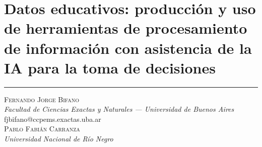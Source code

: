 \thispagestyle{portadapage}
\setcounter{subsection}{0}
\setcounter{subsubsection}{0}
\setcounter{actividad}{0}
\setcounter{actividad_previa}{0}
\setcounter{actividad_entre}{0}
\renewcommand{\articulotipo}{Taller}
\renewcommand{\articulotitulo}{Datos educativos: producción y uso de herramientas de procesamiento de información con asistencia de la IA para la toma de decisiones}
\renewcommand{\articulotitulocorto}{Datos educativos: producción y uso de herramientas de procesamiento de información con asistencia de la IA}
\section{\articulotitulo}

\noindent\rule{\linewidth}{2pt}

\vspace{0.25cm}

\begin{flushright}
	{\Large \scshape
		Fernando Jorge Bifano
	}\\
	{\large \itshape
		Facultad de Ciencias Exactas y Naturales — Universidad de Buenos Aires
	}\\
	{\ttfamily \small
		fjbifano@ccpems.exactas.uba.ar
	}\\
	\vspace{1em}
	{\Large \scshape
		Pablo Fabián Carranza
	}\\
	{\large \itshape
		Universidad Nacional de Río Negro
	}\\
	\vspace{1em}
\end{flushright}

\vspace{0.5cm}

